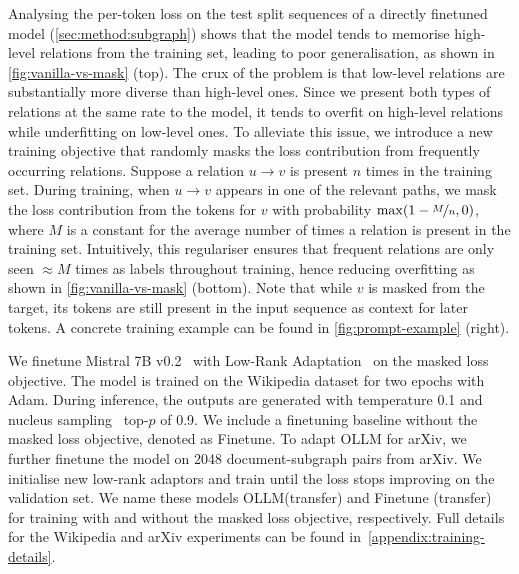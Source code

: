 \documentclass{article}
\newcommand{\name}{{OLLM}\xspace}
\begin{document}
Analysing the per-token loss on the test split sequences of a directly finetuned model (\cref{sec:method:subgraph}) shows that the model tends to memorise high-level relations from the training set, leading to poor generalisation, as shown in \cref{fig:vanilla-vs-mask} (top).
The crux of the problem is that low-level relations are substantially more diverse than high-level ones. Since we present both types of relations at the same rate to the model, it tends to overfit on high-level relations while underfitting on low-level ones. 
To alleviate this issue, we introduce a new training objective that randomly masks the loss contribution from frequently occurring relations. Suppose a relation $u \to v$ is present $n$ times in the training set. During training, when $u \to v$ appears in one of the relevant paths, we mask the loss contribution from the tokens for $v$ with probability $\max(1 - \nicefrac{M}{n}, 0)$, where $M$ is a constant for the average number of times a relation is present in the training set. Intuitively, this regulariser ensures that frequent relations are only seen $\approx\!M$ times as labels throughout training, hence reducing overfitting as shown in \cref{fig:vanilla-vs-mask} (bottom). Note that while $v$ is masked from the target, its tokens are still present in the input sequence as context for later tokens. A concrete training example can be found in \cref{fig:prompt-example} (right). 

We finetune Mistral 7B v0.2~\cite{jiang2023mistral} with Low-Rank Adaptation~\cite{hu2021lora} on the masked loss objective. The model is trained on the Wikipedia dataset for two epochs with Adam. During inference, the outputs are generated with temperature 0.1 and nucleus sampling~\cite{holtzman2019curious} top-$p$ of 0.9. We include a finetuning baseline without the masked loss objective, denoted as Finetune. To adapt \name for arXiv, we further finetune the model on 2048 document-subgraph pairs from arXiv. We initialise new low-rank adaptors and train until the loss stops improving on the validation set. We name these models \name (transfer) and Finetune (transfer) for training with and without the masked loss objective, respectively. Full details for the Wikipedia and arXiv experiments can be found in~\cref{appendix:training-details}.
\end{document}
